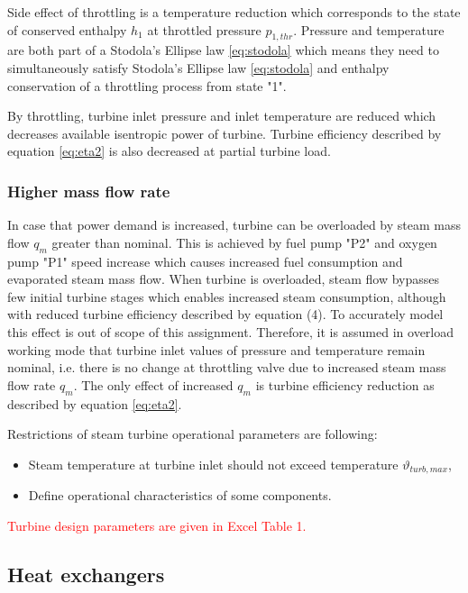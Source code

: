 \documentclass{article}
\begin{document}
	Side effect of throttling is a temperature reduction which corresponds to the state of conserved enthalpy $h_1$ at throttled pressure $p_{1,thr}$. Pressure and temperature are both part of a Stodola’s Ellipse law \ref{eq:stodola} which means they need to simultaneously satisfy Stodola’s Ellipse law  \ref{eq:stodola}  and enthalpy conservation of a throttling process from state "1".
	
	By throttling, turbine inlet pressure and inlet temperature are reduced which decreases available isentropic power of turbine. Turbine efficiency described by equation \ref{eq:eta2} is also decreased at partial turbine load.
	
	\subsubsection*{Higher mass flow rate}
	
	In case that power demand is increased, turbine can be overloaded by steam mass flow $q_m$ greater than nominal. This is achieved by fuel pump "P2" and oxygen pump "P1" speed increase which causes increased fuel consumption and evaporated steam mass flow. When turbine is overloaded, steam flow bypasses few initial turbine stages which enables increased steam consumption, although with reduced turbine efficiency described by equation (4). To accurately model this effect is out of scope of this assignment. Therefore, it is assumed in overload working mode that turbine inlet values of pressure and temperature remain nominal, i.e. there is no change at throttling valve due to increased steam mass flow rate $q_m$. The only effect of increased $q_m$ is turbine efficiency reduction as described by equation \ref{eq:eta2}.
	
	Restrictions of steam turbine operational parameters are following:
	
	\begin{itemize}
		\item Steam temperature at turbine inlet should not exceed temperature $\vartheta_{turb,max}$,
		\item Define operational characteristics of some components.
	\end{itemize}
	
	\noindent
	\textcolor{red}{Turbine design parameters are given in Excel Table 1.}
	
	\subsection{Heat exchangers}
	
\end{document}
